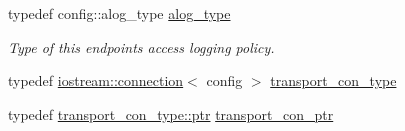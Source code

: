 \begin{DoxyCompactItemize}
typedef config\+::alog\+\_\+type \hyperlink{classwebsocketpp_1_1transport_1_1iostream_1_1endpoint_af176dc3a44caefab71de271c27873c81}{alog\+\_\+type}
\begin{DoxyCompactList}\small\item\em Type of this endpoint\textquotesingle{}s access logging policy. \end{DoxyCompactList}\item 
typedef \hyperlink{classwebsocketpp_1_1transport_1_1iostream_1_1connection}{iostream\+::connection}$<$ config $>$ \hyperlink{classwebsocketpp_1_1transport_1_1iostream_1_1endpoint_a01827f94c5d01289975146f0438ee79b}{transport\+\_\+con\+\_\+type}
\item 
typedef \hyperlink{classwebsocketpp_1_1transport_1_1iostream_1_1connection_a054436e87f6dc4404b13f6131707d2ab}{transport\+\_\+con\+\_\+type\+::ptr} \hyperlink{classwebsocketpp_1_1transport_1_1iostream_1_1endpoint_a709bba4a4e1e2b7829abe4aa55de8078}{transport\+\_\+con\+\_\+ptr}
\end{DoxyCompactItemize}
